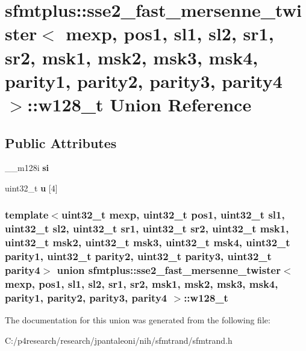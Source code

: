 \hypertarget{unionsfmtplus_1_1sse2__fast__mersenne__twister_1_1w128__t}{
\section{sfmtplus\-:\-:sse2\-\_\-fast\-\_\-mersenne\-\_\-twister$<$ mexp, pos1, sl1, sl2, sr1, sr2, msk1, msk2, msk3, msk4, parity1, parity2, parity3, parity4 $>$\-:\-:w128\-\_\-t \-Union \-Reference}
\label{unionsfmtplus_1_1sse2__fast__mersenne__twister_1_1w128__t}
}
\subsection*{\-Public \-Attributes}
\begin{DoxyCompactItemize}
\item 
\hypertarget{unionsfmtplus_1_1sse2__fast__mersenne__twister_1_1w128__t_a9f3608589d655154caac86904f4ed67a}{
\-\_\-\-\_\-m128i {\bfseries si}}
\label{unionsfmtplus_1_1sse2__fast__mersenne__twister_1_1w128__t_a9f3608589d655154caac86904f4ed67a}

\item 
\hypertarget{unionsfmtplus_1_1sse2__fast__mersenne__twister_1_1w128__t_a5008e19126ebe898538c431e635183d7}{
uint32\-\_\-t {\bfseries u} \mbox{[}4\mbox{]}}
\label{unionsfmtplus_1_1sse2__fast__mersenne__twister_1_1w128__t_a5008e19126ebe898538c431e635183d7}

\end{DoxyCompactItemize}
\subsubsection*{template$<$uint32\-\_\-t mexp, uint32\-\_\-t pos1, uint32\-\_\-t sl1, uint32\-\_\-t sl2, uint32\-\_\-t sr1, uint32\-\_\-t sr2, uint32\-\_\-t msk1, uint32\-\_\-t msk2, uint32\-\_\-t msk3, uint32\-\_\-t msk4, uint32\-\_\-t parity1, uint32\-\_\-t parity2, uint32\-\_\-t parity3, uint32\-\_\-t parity4$>$ union sfmtplus\-::sse2\-\_\-fast\-\_\-mersenne\-\_\-twister$<$ mexp, pos1, sl1, sl2, sr1, sr2, msk1, msk2, msk3, msk4, parity1, parity2, parity3, parity4 $>$\-::w128\-\_\-t}



\-The documentation for this union was generated from the following file\-:\begin{DoxyCompactItemize}
\item 
\-C\-:/p4research/research/jpantaleoni/nih/sfmtrand/sfmtrand.\-h\end{DoxyCompactItemize}
